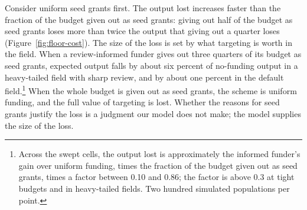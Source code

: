 \documentclass[article, 11pt, reqno]{amsart}
\theoremstyle{named}
\begin{document}
Consider uniform seed grants first. The output lost increases faster than the fraction of the budget given out as seed grants: giving out half of the budget as seed grants loses more than twice the output that giving out a quarter loses (Figure~\ref{fig:floor-cost}). The size of the loss is set by what targeting is worth in the field. When a review-informed funder gives out three quarters of its budget as seed grants, expected output falls by about six percent of no-funding output in a heavy-tailed field with sharp review, and by about one percent in the default field.\footnote{Across the swept cells, the output lost is approximately the informed funder's gain over uniform funding, times the fraction of the budget given out as seed grants, times a factor between 0.10 and 0.86; the factor is above 0.3 at tight budgets and in heavy-tailed fields. Two hundred simulated populations per point.} When the whole budget is given out as seed grants, the scheme is uniform funding, and the full value of targeting is lost. Whether the reasons for seed grants justify the loss is a judgment our model does not make; the model supplies the size of the loss.


\end{document}
